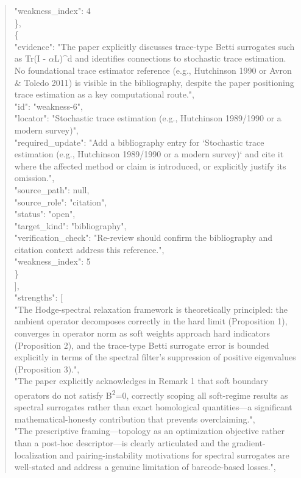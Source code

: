 \documentclass[11pt]{article}
\begin{document}
\begin{quote}
      "weakness\_index": 4\\
    \},\\
    \{\\
      "evidence": "The paper explicitly discusses trace-type Betti surrogates such as Tr(I - \ensuremath{\alpha}L)\^{}d and identifies connections to stochastic trace estimation. No foundational trace estimator reference (e.g., Hutchinson 1990 or Avron \& Toledo 2011) is visible in the bibliography, despite the paper positioning trace estimation as a key computational route.",\\
      "id": "weakness-6",\\
      "locator": "Stochastic trace estimation (e.g., Hutchinson 1989/1990 or a modern survey)",\\
      "required\_update": "Add a bibliography entry for `Stochastic trace estimation (e.g., Hutchinson 1989/1990 or a modern survey)` and cite it where the affected method or claim is introduced, or explicitly justify its omission.",\\
      "source\_path": null,\\
      "source\_role": "citation",\\
      "status": "open",\\
      "target\_kind": "bibliography",\\
      "verification\_check": "Re-review should confirm the bibliography and citation context address this reference.",\\
      "weakness\_index": 5\\
    \}\\
  ],\\
  "strengths": [\\
    "The Hodge-spectral relaxation framework is theoretically principled: the ambient operator decomposes correctly in the hard limit (Proposition 1), converges in operator norm as soft weights approach hard indicators (Proposition 2), and the trace-type Betti surrogate error is bounded explicitly in terms of the spectral filter's suppression of positive eigenvalues (Proposition 3).",\\
    "The paper explicitly acknowledges in Remark 1 that soft boundary operators do not satisfy B\textsuperscript{2}=0, correctly scoping all soft-regime results as spectral surrogates rather than exact homological quantities---a significant mathematical-honesty contribution that prevents overclaiming.",\\
    "The prescriptive framing---topology as an optimization objective rather than a post-hoc descriptor---is clearly articulated and the gradient-localization and pairing-instability motivations for spectral surrogates are well-stated and address a genuine limitation of barcode-based losses.",\\

\end{quote}
\end{document}
